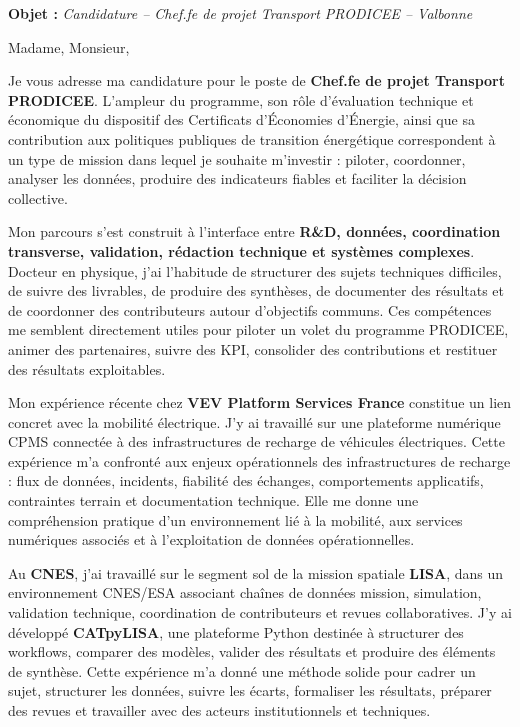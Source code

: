 \documentclass[11pt,a4paper]{altacv}
\begin{document}
\makecvheader
\vspace{-0.65cm}

\vspace{-0.45cm}

{\color{accent}\textbf{Objet :}} \textit{Candidature -- Chef.fe de projet Transport PRODICEE -- Valbonne}

{\color{body}

Madame, Monsieur,

Je vous adresse ma candidature pour le poste de \textbf{Chef.fe de projet Transport PRODICEE}. L’ampleur du programme, son rôle d’évaluation technique et économique du dispositif des Certificats d'Économies d'Énergie, ainsi que sa contribution aux politiques publiques de transition énergétique correspondent à un type de mission dans lequel je souhaite m’investir : piloter, coordonner, analyser les données, produire des indicateurs fiables et faciliter la décision collective.

Mon parcours s’est construit à l’interface entre \textbf{R\&D, données, coordination transverse, validation, rédaction technique et systèmes complexes}. Docteur en physique, j’ai l’habitude de structurer des sujets techniques difficiles, de suivre des livrables, de produire des synthèses, de documenter des résultats et de coordonner des contributeurs autour d’objectifs communs. Ces compétences me semblent directement utiles pour piloter un volet du programme PRODICEE, animer des partenaires, suivre des KPI, consolider des contributions et restituer des résultats exploitables.

Mon expérience récente chez \textbf{VEV Platform Services France} constitue un lien concret avec la mobilité électrique. J’y ai travaillé sur une plateforme numérique CPMS connectée à des infrastructures de recharge de véhicules électriques. Cette expérience m’a confronté aux enjeux opérationnels des infrastructures de recharge : flux de données, incidents, fiabilité des échanges, comportements applicatifs, contraintes terrain et documentation technique. Elle me donne une compréhension pratique d’un environnement lié à la mobilité, aux services numériques associés et à l’exploitation de données opérationnelles.

Au \textbf{CNES}, j’ai travaillé sur le segment sol de la mission spatiale \textbf{LISA}, dans un environnement CNES/ESA associant chaînes de données mission, simulation, validation technique, coordination de contributeurs et revues collaboratives. J’y ai développé \textbf{CATpyLISA}, une plateforme Python destinée à structurer des workflows, comparer des modèles, valider des résultats et produire des éléments de synthèse. Cette expérience m’a donné une méthode solide pour cadrer un sujet, structurer les données, suivre les écarts, formaliser les résultats, préparer des revues et travailler avec des acteurs institutionnels et techniques.

}
\end{document}
